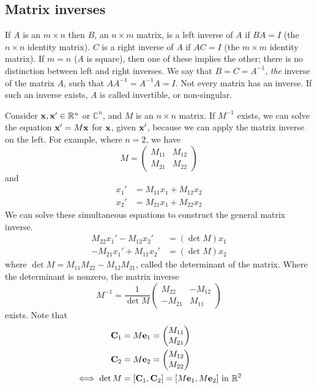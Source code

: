 \subsection{Matrix inverses}
If \(A\) is an \(m \times n\) then \(B\), an \(n \times m\) matrix, is a left inverse of \(A\) if \(BA = I\) (the \(n \times n\) identity matrix).
\(C\) is a right inverse of \(A\) if \(AC = I\) (the \(m \times m\) identity matrix).
If \(m = n\) (\(A\) is square), then one of these implies the other; there is no distinction between left and right inverses.
We say that \(B = C = A^{-1}\), \textit{the} inverse of the matrix \(A\), such that \(AA^{-1} = A^{-1}A = I\).
Not every matrix has an inverse.
If such an inverse exists, \(A\) is called invertible, or non-singular.

Consider \(\vb x, \vb x' \in \mathbb R^n\) or \(\mathbb C^n\), and \(M\) is an \(n \times n\) matrix.
If \(M^{-1}\) exists, we can solve the equation \(\vb x' = M \vb x\) for \(\vb x\), given \(\vb x'\), because we can apply the matrix inverse on the left.
For example, where \(n=2\), we have
\[
	M = \begin{pmatrix}
		M_{11} & M_{12} \\
		M_{21} & M_{22}
	\end{pmatrix}
\]
and
\begin{align*}
	x_1' & = M_{11}x_1 + M_{12}x_2 \\
	x_2' & = M_{21}x_1 + M_{22}x_2
\end{align*}
We can solve these simultaneous equations to construct the general matrix inverse.
\begin{align*}
	M_{22} x_1' - M_{12}x_2'  & = (\det M)x_1 \\
	-M_{21} x_1' + M_{11}x_2' & = (\det M)x_2
\end{align*}
where \(\det M = M_{11} M_{22} - M_{12} M_{21}\), called the determinant of the matrix.
Where the determinant is nonzero, the matrix inverse
\[
	M^{-1} = \frac{1}{\det M}\begin{pmatrix}
		M_{22}  & -M_{12} \\
		-M_{21} & M_{11}
	\end{pmatrix}
\]
exists.
Note that
\begin{align*}
	\vb C_1     & = M \vb e_1 = \begin{pmatrix} M_{11} \\ M_{21} \end{pmatrix}        \\
	\vb C_2     & = M \vb e_2 = \begin{pmatrix} M_{12} \\ M_{22} \end{pmatrix}        \\
	\iff \det M & = [\vb C_1, \vb C_2] = [M\vb e_1, M\vb e_2] \text{ in } \mathbb R^2
\end{align*}
